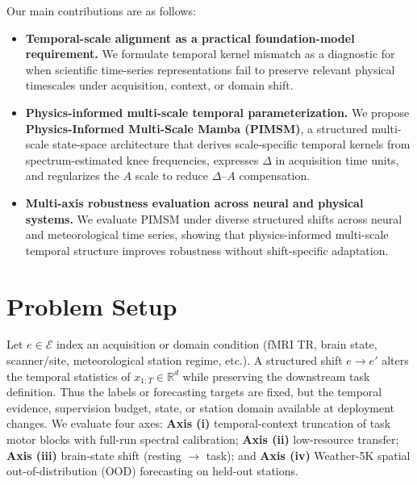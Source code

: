 \documentclass{article}
\begin{document}
Our main contributions are as follows:

\begin{itemize}
\item \textbf{Temporal-scale alignment as a practical foundation-model requirement.}
We formulate temporal kernel mismatch as a diagnostic for when scientific time-series representations fail to preserve relevant physical timescales under acquisition, context, or domain shift.
\item \textbf{Physics-informed multi-scale temporal parameterization.}
We propose \textbf{Physics-Informed Multi-Scale Mamba (PIMSM)}, a structured multi-scale state-space architecture that derives scale-specific temporal kernels from spectrum-estimated knee frequencies, expresses $\Delta$ in acquisition time units, and regularizes the $A$ scale to reduce $\Delta$--$A$ compensation.
\item \textbf{Multi-axis robustness evaluation across neural and physical systems.}
We evaluate PIMSM under diverse structured shifts across neural and meteorological time series, showing that physics-informed multi-scale temporal structure improves robustness without shift-specific adaptation.
\end{itemize}


\section{Problem Setup}
\label{sec:problem}

Let $e \in \mathcal{E}$ index an acquisition or domain condition (fMRI TR, brain state, scanner/site, meteorological station regime, etc.).
A structured shift $e \to e'$ alters the temporal statistics of $x_{1:T} \in \mathbb{R}^d$ while preserving the downstream task definition.
Thus the labels or forecasting targets are fixed, but the temporal evidence, supervision budget, state, or station domain available at deployment changes.
We evaluate four axes: \textbf{Axis (i)} temporal-context truncation of task motor blocks with full-run spectral calibration; \textbf{Axis (ii)} low-resource transfer; \textbf{Axis (iii)} brain-state shift (resting $\to$ task); and \textbf{Axis (iv)} Weather-5K spatial out-of-distribution (OOD) forecasting on held-out stations.
\end{document}
